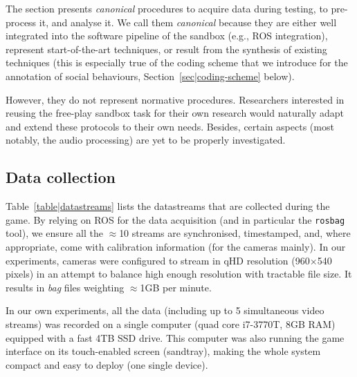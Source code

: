 \documentclass[sigconf]{acmart}
\newcommand{\eg}{e.g.,\xspace}
\begin{document}
The section presents \emph{canonical} procedures to acquire data during testing,
to pre-process it, and analyse it. We call them \emph{canonical} because they
are either well integrated into the software pipeline of the sandbox (\eg ROS
integration), represent start-of-the-art techniques, or result from the 
synthesis of existing techniques (this is especially true of the coding scheme
that we introduce for the annotation of social behaviours,
Section~\ref{sec|coding-scheme} below).

However, they do not represent normative procedures. Researchers interested in
reusing the free-play sandbox task for their own research would naturally adapt
and extend these protocols to their own needs. Besides, certain aspects (most
notably, the audio processing) are yet to be properly investigated.

\subsection{Data collection}

Table~\ref{table|datastreams} lists the datastreams that are collected during
the game. By relying on ROS for the data acquisition (and in particular the
\texttt{rosbag} tool), we ensure all the $\approx$10 streams are synchronised,
timestamped, and, where appropriate, come with calibration information (for the
cameras mainly). In our experiments, cameras were configured to stream in qHD
resolution (960$\times$540 pixels) in an attempt to balance high enough
resolution with tractable file size. It results in \emph{bag} files weighting
$\approx$1GB per minute.

In our own experiments, all the data (including up to 5 simultaneous video
streams) was recorded on a single computer (quad core i7-3770T, 8GB RAM)
equipped with a fast 4TB SSD drive. This computer was also running the game
interface on its touch-enabled screen (sandtray), making the whole system
compact and easy to deploy (one single device).
\end{document}
